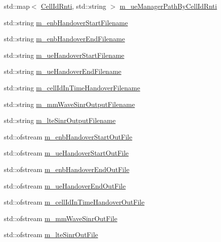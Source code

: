 \begin{DoxyCompactItemize}
std\+::map$<$ \hyperlink{structns3_1_1MmWaveBearerStatsConnector_1_1CellIdRnti}{Cell\+Id\+Rnti}, std\+::string $>$ \hyperlink{classns3_1_1MmWaveBearerStatsConnector_a2e594f10e75a9fadbb3519a1dfc38081}{m\+\_\+ue\+Manager\+Path\+By\+Cell\+Id\+Rnti}
\item 
std\+::string \hyperlink{classns3_1_1MmWaveBearerStatsConnector_a71532d725513969d28a3c2aad0c947d9}{m\+\_\+enb\+Handover\+Start\+Filename}
\item 
std\+::string \hyperlink{classns3_1_1MmWaveBearerStatsConnector_a6bb88676d329a8a55fb50179e53bdbee}{m\+\_\+enb\+Handover\+End\+Filename}
\item 
std\+::string \hyperlink{classns3_1_1MmWaveBearerStatsConnector_a23f6f48c61d322fd149984d11d73b42d}{m\+\_\+ue\+Handover\+Start\+Filename}
\item 
std\+::string \hyperlink{classns3_1_1MmWaveBearerStatsConnector_a323f1b3c8313c14483b40b7010ca6a87}{m\+\_\+ue\+Handover\+End\+Filename}
\item 
std\+::string \hyperlink{classns3_1_1MmWaveBearerStatsConnector_a466692bf45a3aefa17d91b87be2c6dce}{m\+\_\+cell\+Id\+In\+Time\+Handover\+Filename}
\item 
std\+::string \hyperlink{classns3_1_1MmWaveBearerStatsConnector_a5adea887f7d9677e281482591f490ed8}{m\+\_\+mm\+Wave\+Sinr\+Output\+Filename}
\item 
std\+::string \hyperlink{classns3_1_1MmWaveBearerStatsConnector_a4f44ad63a2a3b070fd22f1c51a38cb0c}{m\+\_\+lte\+Sinr\+Output\+Filename}
\item 
std\+::ofstream \hyperlink{classns3_1_1MmWaveBearerStatsConnector_ac20a7aec10d568ef23d43ebc8e8ef9c2}{m\+\_\+enb\+Handover\+Start\+Out\+File}
\item 
std\+::ofstream \hyperlink{classns3_1_1MmWaveBearerStatsConnector_a43b081d16c706f202bde185dba54e4e2}{m\+\_\+ue\+Handover\+Start\+Out\+File}
\item 
std\+::ofstream \hyperlink{classns3_1_1MmWaveBearerStatsConnector_ad834b176098637ee61c5ed55fa5ab34b}{m\+\_\+enb\+Handover\+End\+Out\+File}
\item 
std\+::ofstream \hyperlink{classns3_1_1MmWaveBearerStatsConnector_a76810ed1087b16f420716ad43159337d}{m\+\_\+ue\+Handover\+End\+Out\+File}
\item 
std\+::ofstream \hyperlink{classns3_1_1MmWaveBearerStatsConnector_a05031bdd1eb6cbd4f3124e0523dd2b06}{m\+\_\+cell\+Id\+In\+Time\+Handover\+Out\+File}
\item 
std\+::ofstream \hyperlink{classns3_1_1MmWaveBearerStatsConnector_ae6f22a7cc7a4d76bed7922579bc4d2be}{m\+\_\+mm\+Wave\+Sinr\+Out\+File}
\item 
std\+::ofstream \hyperlink{classns3_1_1MmWaveBearerStatsConnector_aa0a0d85bceae95a8f8e62e7920bf76ef}{m\+\_\+lte\+Sinr\+Out\+File}
\end{DoxyCompactItemize}
